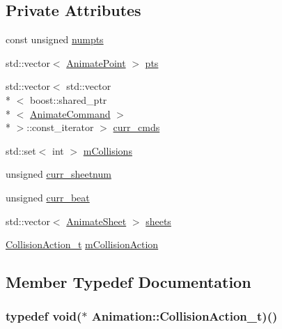 \subsection*{Private Attributes}
\begin{DoxyCompactItemize}
\item 
const unsigned \hyperlink{a00010_acaf7f9a7901248baea8d8166b2808116}{numpts}
\item 
std\-::vector$<$ \hyperlink{a00196_a91212e6bb797b2b440819b6a9a86f702}{Animate\-Point} $>$ \hyperlink{a00010_aa0df8c15f9b19dbe028c86dd4e2f6621}{pts}
\item 
std\-::vector$<$ std\-::vector\\*
$<$ boost\-::shared\-\_\-ptr\\*
$<$ \hyperlink{a00003}{Animate\-Command} $>$\\*
 $>$\-::const\-\_\-iterator $>$ \hyperlink{a00010_a9e66fe602b1bacfac5a65921b1976875}{curr\-\_\-cmds}
\item 
std\-::set$<$ int $>$ \hyperlink{a00010_af39cf527a79753494729d7985126acde}{m\-Collisions}
\item 
unsigned \hyperlink{a00010_a8aca3cfaa97f1c60edd531ef2f9c2d53}{curr\-\_\-sheetnum}
\item 
unsigned \hyperlink{a00010_acef8e877990ac43138c8e29436c6c38d}{curr\-\_\-beat}
\item 
std\-::vector$<$ \hyperlink{a00008}{Animate\-Sheet} $>$ \hyperlink{a00010_a6d138f4ed50295d2ef8c6d336df37324}{sheets}
\item 
\hyperlink{a00010_acf8ace9aee0e09e12c10002bcde0459c}{Collision\-Action\-\_\-t} \hyperlink{a00010_a8f4074da4b09a0fd464099f193354833}{m\-Collision\-Action}
\end{DoxyCompactItemize}


\subsection{Member Typedef Documentation}
\hypertarget{a00010_acf8ace9aee0e09e12c10002bcde0459c}{
\subsubsection[{Collision\-Action\-\_\-t}]{\setlength{\rightskip}{0pt plus 5cm}typedef void($\ast$ Animation\-::\-Collision\-Action\-\_\-t)()}}\label{a00010_acf8ace9aee0e09e12c10002bcde0459c}


